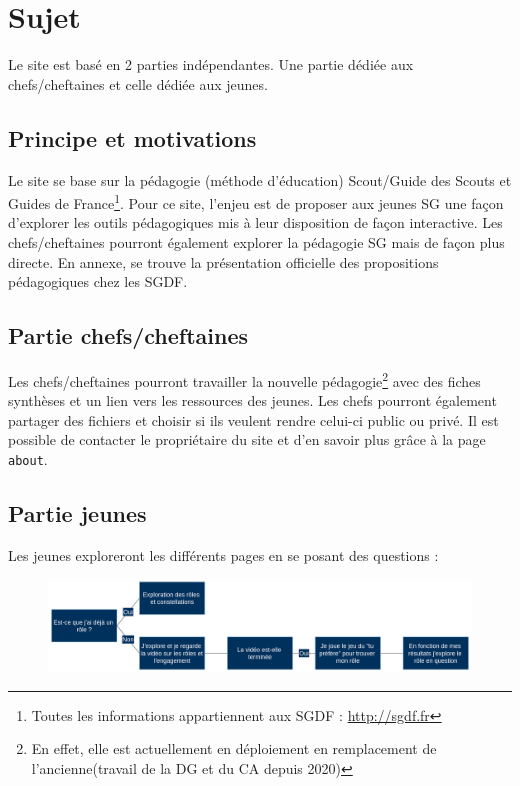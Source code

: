 \documentclass[a4paper, 12pt]{article}
\author{Mickael GAULT}
\title{}
\date{\today}
\begin{document}
\maketitle
\newpage
\tableofcontents
\newpage
\section{Sujet}
Le site est basé en 2 parties indépendantes. Une partie dédiée aux chefs/cheftaines et celle dédiée aux jeunes.
\subsection{Principe et motivations}
Le site se base sur la pédagogie (méthode d'éducation) Scout/Guide des Scouts et Guides de France\footnote{Toutes les informations appartiennent aux SGDF : \url{http://sgdf.fr}}. Pour ce site, l'enjeu est de proposer aux jeunes SG une façon d'explorer les outils pédagogiques mis à leur disposition de façon interactive. Les chefs/cheftaines pourront également explorer la pédagogie SG mais de façon plus directe. En annexe, se trouve la présentation officielle des propositions pédagogiques chez les SGDF.
\subsection{Partie chefs/cheftaines}
Les chefs/cheftaines pourront travailler la nouvelle pédagogie\footnote{En effet, elle est actuellement en déploiement en remplacement de l'ancienne(travail de la DG et du CA depuis 2020)} avec des fiches synthèses et un lien vers les ressources des jeunes. Les chefs pourront également partager des fichiers et choisir si ils veulent rendre celui-ci public ou privé. Il est possible de contacter le propriétaire du site et d'en savoir plus grâce à la page \verb+about+.
\subsection{Partie jeunes}
 Les jeunes exploreront les différents pages en se posant des questions :
\begin{figure}[!h]
  \center
  \includegraphics[scale=0.3]{decision_tree.png}
\end{figure}
\end{document}
